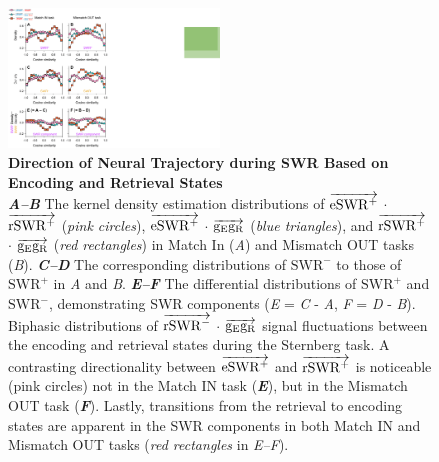\documentclass[final,3p,times,twocolumn]{elsarticle}
\begin{document}
        \clearpage
        \begin{figure}[ht]
        	\centering
            \includegraphics[width=0.5\textwidth]{./src/figures/.png/Figure_ID_07.png}
        	\caption{\textbf{
Direction of Neural Trajectory during SWR Based on Encoding and Retrieval States
}
\smallskip
\\
\textbf{\textit{A--B}} The kernel density estimation distributions of $\protect\overrightarrow{{\mathrm{eSWR^+}}}$ $\cdot$ $\protect\overrightarrow{{\mathrm{rSWR^+}}}$ (\textit{pink circles}), $\protect\overrightarrow{{\mathrm{eSWR^+}}}$ $\cdot$ $\protect\overrightarrow{{\mathrm{g_{E}g_{R}}}}$ (\textit{blue triangles}), and $\protect\overrightarrow{{\mathrm{rSWR^+}}}$ $\cdot$ $\protect\overrightarrow{{\mathrm{g_{E}g_{R}}}}$ (\textit{red rectangles}) in Match In (\textit{A}) and Mismatch OUT tasks (\textit{B}). \textbf{\textit{C--D}} The corresponding distributions of $\mathrm{SWR^-}$ to those of $\mathrm{SWR^+}$ in \textit{A} and \textit{B}. \textbf{\textit{E--F}} The differential distributions of $\mathrm{SWR^+}$ and $\mathrm{SWR^-}$, demonstrating SWR components (\textit{E} = \textit{C} - \textit{A}, \textit{F} = \textit{D} - \textit{B}). Biphasic distributions of $\protect\overrightarrow{{\mathrm{rSWR^-}}}$ $\cdot$ $\protect\overrightarrow{{\mathrm{g_{E}g_{R}}}}$ signal fluctuations between the encoding and retrieval states during the Sternberg task. A contrasting directionality between $\protect\overrightarrow{{\mathrm{eSWR^+}}}$ and $\protect\overrightarrow{{\mathrm{rSWR^+}}}$ is noticeable (pink circles) not in the Match IN task (\textbf{\textit{E}}), but in the Mismatch OUT task (\textbf{\textit{F}}). Lastly, transitions from the retrieval to encoding states are apparent in the SWR components in both Match IN and Mismatch OUT tasks (\textit{red rectangles} in \textit{E--F}).
}
        	\label{fig:07}
        \end{figure}

\end{document}
